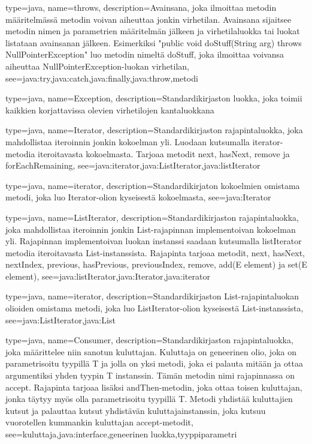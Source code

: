 {
	type=java,
	name=throws,
	description={Avainsana, joka ilmoittaa metodin määritelmässä metodin voivan aiheuttaa jonkin
virhetilan. Avainsana sijaitsee metodin nimen ja parametrien määritelmän jälkeen ja
virhetilaluokka tai luokat listataan avainsanan jälkeen. Esimerkiksi "public void doStuff(String
arg) throws NullPointerException" luo metodin nimeltä doStuff, joka ilmoittaa voivansa aiheuttaa
NullPointerException-luokan virhetilan},
	see={java:try,java:catch,java:finally,java:throw,metodi}
}

{
	type=java,
	name=Exception,
	description={Standardikirjaston luokka, joka toimii kaikkien korjattavissa olevien
virhetilojen kantaluokkana}
}

{
	type=java,
	name=Iterator,
	description={Standardikirjaston rajapintaluokka, joka mahdollistaa iteroinnin jonkin kokoelman
yli. Luodaan kutsumalla iterator-metodia iteroitavasta kokoelmasta. Tarjoaa metodit next, hasNext,
remove ja forEachRemaining},
	see={java:iterator,java:ListIterator,java:listIterator}
}

{
	type=java,
	name=iterator,
	description={Standardikirjaton kokoelmien omistama metodi, joka luo Iterator-olion kyseisestä
kokoelmasta},
	see={java:Iterator}
}

{
	type=java,
	name=ListIterator,
	description={Standardikirjaston rajapintaluokka, joka mahdollistaa iteroinnin jonkin
List-rajapinnan implementoivan kokoelman yli. Rajapinnan implementoivan luokan instanssi saadaan
kutsumalla listIterator metodia iteroitavasta List-instanssista. Rajapinta tarjoaa metodit, next,
hasNext, nextIndex, previous, hasPrevious, previousIndex, remove, add(E element) ja set(E
element)},
	see={java:listIterator,java:Iterator,java:iterator}
}

{
	type=java,
	name=iterator,
	description={Standardikirjaston List-rajapintaluokan olioiden omistama metodi, joka luo
ListIterator-olion kyseisestä List-instanssista},
	see={java:ListIterator,java:List}
}

{
	type=java,
	name=Consumer,
	description={Standardikirjaston rajapintaluokka, joka määrittelee niin sanotun kuluttajan.
Kuluttaja on geneerinen olio, joka on parametrisoitu tyypillä T ja jolla on yksi metodi, joka ei
palauta mitään ja ottaa argumentiksi yhden tyypin T instanssin. Tämän metodin nimi rajapinnassa on
accept. Rajapinta tarjoaa lisäksi andThen-metodin, joka ottaa toisen kuluttajan, jonka täytyy myös
olla parametrisoitu tyypillä T. Metodi yhdistää kuluttajien kutsut ja palauttaa kutsut yhdistävän
kuluttajainstanssin, joka kutsuu vuorotellen kummankin kuluttajan accept-metodit},
	see={kuluttaja,java:interface,geneerinen luokka,tyyppiparametri}
}

